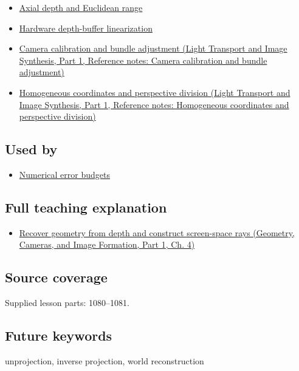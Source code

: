 \begin{itemize}
\tightlist
\item
  \hyperref[appendix-cac01ebeeb11]{Axial depth and Euclidean range}
\item
  \hyperref[appendix-1bc40b08db4a]{Hardware depth-buffer linearization}
\item
  \href{../04-Light-Transport-and-Image-Synthesis-P01/main.pdf\#appendix-3ee9861904d5}{Camera calibration and bundle adjustment (Light Transport and Image Synthesis, Part 1, Reference notes: Camera calibration and bundle adjustment)}
\item
  \href{../04-Light-Transport-and-Image-Synthesis-P01/main.pdf\#appendix-cb3b26862282}{Homogeneous coordinates and perspective division (Light Transport and Image Synthesis, Part 1, Reference notes: Homogeneous coordinates and perspective division)}
\end{itemize}

\subsection{Used by}\label{appendix-2cbf2968e866-used-by}

\hypertarget{appendix-2cbf2968e866-used-by}{}

\begin{itemize}
\tightlist
\item
  \hyperref[appendix-31b8c295e05f]{Numerical error budgets}
\end{itemize}

\subsection{Full teaching explanation}\label{appendix-2cbf2968e866-full-teaching-explanation}

\hypertarget{appendix-2cbf2968e866-full-teaching-explanation}{}

\begin{itemize}
\tightlist
\item
  \href{../03-Geometry-Cameras-and-Image-Formation-P01/main.pdf\#02-foundations-ii-ch035-recover-geometry-from-depth-and-construct-screen-space-rays}{Recover geometry from depth and construct screen-space rays (Geometry, Cameras, and Image Formation, Part 1, Ch. 4)}
\end{itemize}

\subsection{Source coverage}\label{appendix-2cbf2968e866-source-coverage}

\hypertarget{appendix-2cbf2968e866-source-coverage}{}

Supplied lesson parts: 1080--1081.

\subsection{Future keywords}\label{appendix-2cbf2968e866-future-keywords}

\hypertarget{appendix-2cbf2968e866-future-keywords}{}

unprojection, inverse projection, world reconstruction
